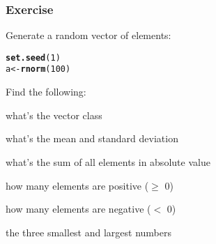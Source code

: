 \documentclass[12pt]{beamer}\usepackage[]{graphicx}\usepackage[]{color}
\makeatletter
\newcommand{\hlnum}[1]{\textcolor[rgb]{0.686,0.059,0.569}{#1}}%
\newcommand{\hlstd}[1]{\textcolor[rgb]{0.345,0.345,0.345}{#1}}%
\newcommand{\hlkwb}[1]{\textcolor[rgb]{0.69,0.353,0.396}{#1}}%
\newcommand{\hlkwd}[1]{\textcolor[rgb]{0.737,0.353,0.396}{\textbf{#1}}}%
\newenvironment{kframe}{%
 \def\at@end@of@kframe{}%
 \ifinner\ifhmode%
  \def\at@end@of@kframe{\end{minipage}}%
  \begin{minipage}{\columnwidth}%
 \fi\fi%
 \def\FrameCommand##1{\hskip\@totalleftmargin \hskip-\fboxsep
 \colorbox{shadecolor}{##1}\hskip-\fboxsep
     \hskip-\linewidth \hskip-\@totalleftmargin \hskip\columnwidth}%
 \MakeFramed {\advance\hsize-\width
   \@totalleftmargin\z@ \linewidth\hsize
   \@setminipage}}%
 {\par\unskip\endMakeFramed%
 \at@end@of@kframe}
\newenvironment{knitrout}{}{} %
\makeatother
\begin{document}
\begin{frame}[fragile]
\frametitle{Exercise}

Generate a random vector of  elements:
\begin{knitrout}\footnotesize
{}\color{fgcolor}\begin{kframe}
\begin{alltt}
\hlkwd{set.seed}\hlstd{(}\hlnum{1}\hlstd{)}
\hlstd{a} \hlkwb{<-} \hlkwd{rnorm}\hlstd{(}\hlnum{100}\hlstd{)}
\end{alltt}
\end{kframe}
\end{knitrout}

Find the following:
\bi
  \item what's the vector class
  \item what's the mean and standard deviation
  \item what's the sum of all elements in absolute value
  \item how many elements are positive ($\geq$ 0)
  \item how many elements are negative ($<$ 0)
  \item the three smallest and largest numbers
\ei

\end{frame}

\end{document}
